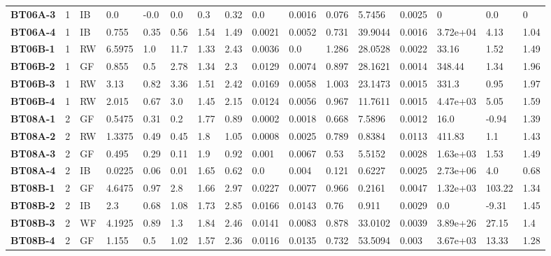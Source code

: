 \begin{table}
{\begin{tabular}{l|c|l|l|l|l|l|l|l|l|l|l|l|l|l|l}
    \bfseries BT06A-3 & 1 & IB & 0.0 & -0.0 & 0.0 & 0.3 & 0.32 & 0.0 & 0.0016 & 0.076 & 5.7456 & 0.0025 & 0 & 0.0 & 0 \\
    \bfseries BT06A-4 & 1 & IB & 0.755 & 0.35 & 0.56 & 1.54 & 1.49 & 0.0021 & 0.0052 & 0.731 & 39.9044 & 0.0016 & 3.72e+04 & 4.13 & 1.04 \\
    \hline
    \bfseries BT06B-1 & 1 & RW & 6.5975 & 1.0 & 11.7 & 1.33 & 2.43 & 0.0036 & 0.0 & 1.286 & 28.0528 & 0.0022 & 33.16 & 1.52 & 1.49 \\
    \bfseries BT06B-2 & 1 & GF & 0.855 & 0.5 & 2.78 & 1.34 & 2.3 & 0.0129 & 0.0074 & 0.897 & 28.1621 & 0.0014 & 348.44 & 1.34 & 1.96 \\
    \bfseries BT06B-3 & 1 & RW & 3.13 & 0.82 & 3.36 & 1.51 & 2.42 & 0.0169 & 0.0058 & 1.003 & 23.1473 & 0.0015 & 331.3 & 0.95 & 1.97 \\
    \bfseries BT06B-4 & 1 & RW & 2.015 & 0.67 & 3.0 & 1.45 & 2.15 & 0.0124 & 0.0056 & 0.967 & 11.7611 & 0.0015 & 4.47e+03 & 5.05 & 1.59 \\
    \hline
    \bfseries BT08A-1 & 2 & GF & 0.5475 & 0.31 & 0.2 & 1.77 & 0.89 & 0.0002 & 0.0018 & 0.668 & 7.5896 & 0.0012 & 16.0 & -0.94 & 1.39 \\
    \bfseries BT08A-2 & 2 & RW & 1.3375 & 0.49 & 0.45 & 1.8 & 1.05 & 0.0008 & 0.0025 & 0.789 & 0.8384 & 0.0113 & 411.83 & 1.1 & 1.43 \\
    \bfseries BT08A-3 & 2 & GF & 0.495 & 0.29 & 0.11 & 1.9 & 0.92 & 0.001 & 0.0067 & 0.53 & 5.5152 & 0.0028 & 1.63e+03 & 1.53 & 1.49 \\
    \bfseries BT08A-4 & 2 & IB & 0.0225 & 0.06 & 0.01 & 1.65 & 0.62 & 0.0 & 0.004 & 0.121 & 0.6227 & 0.0025 & 2.73e+06 & 4.0 & 0.68 \\
    \hline
    \bfseries BT08B-1 & 2 & GF & 4.6475 & 0.97 & 2.8 & 1.66 & 2.97 & 0.0227 & 0.0077 & 0.966 & 0.2161 & 0.0047 & 1.32e+03 & 103.22 & 1.34 \\
    \bfseries BT08B-2 & 2 & IB & 2.3 & 0.68 & 1.08 & 1.73 & 2.85 & 0.0166 & 0.0143 & 0.76 & 0.911 & 0.0029 & 0.0 & -9.31 & 1.45 \\
    \bfseries BT08B-3 & 2 & WF & 4.1925 & 0.89 & 1.3 & 1.84 & 2.46 & 0.0141 & 0.0083 & 0.878 & 33.0102 & 0.0039 & 3.89e+26 & 27.15 & 1.4 \\
    \bfseries BT08B-4 & 2 & GF & 1.155 & 0.5 & 1.02 & 1.57 & 2.36 & 0.0116 & 0.0135 & 0.732 & 53.5094 & 0.003 & 3.67e+03 & 13.33 & 1.28 \\


\end{tabular}}
\end{table} 

